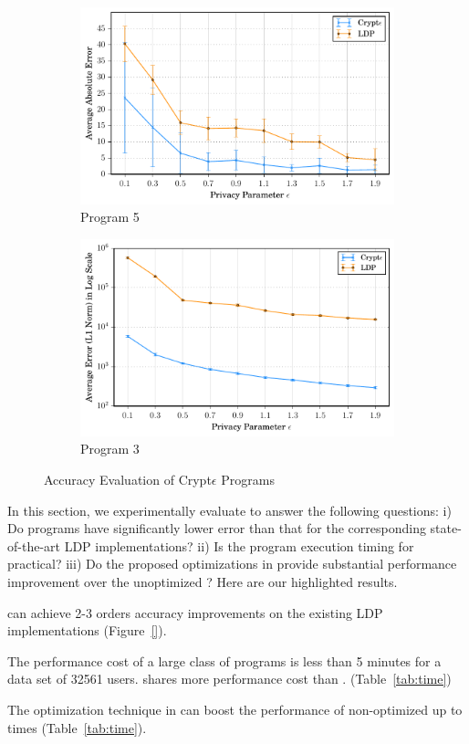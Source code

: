 \begin{figure}[ht]
\begin{subfigure}[b]{0.25\linewidth}
    \centering    \includegraphics[width=1\linewidth]{t7_final.pdf}
        \caption{ Program 5}
        \label{fig:P5}\end{subfigure}%
      \begin{subfigure}[b]{0.25\linewidth}
    \centering    \includegraphics[width=1\linewidth]{t3_final.pdf}
        \caption{Program 3}
        \label{fig:P7}
    \end{subfigure}%
       \caption{Accuracy Evaluation of Crypt$\epsilon$ Programs}
\end{figure}

In this section, we experimentally evaluate \system to answer the following questions: i) Do \system programs have significantly lower error than that for the corresponding state-of-the-art LDP implementations? ii) Is the program execution timing for \system practical? iii) Do the proposed optimizations in \system provide substantial performance improvement over the unoptimized \system? Here are our highlighted results.
\squishlist
\item \system can achieve 2-3 orders accuracy improvements on the existing LDP implementations (Figure~\ref{}).
\item The performance cost of a large class of \system programs is less than 5 minutes for a data set of 32561 users. \AS shares more performance cost than \CPS.  (Table~\ref{tab:time})
\item The optimization technique in \system can boost the performance of non-optimized \system up to  times (Table~\ref{tab:time}).
\squishend


